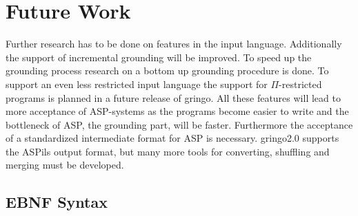\documentclass[a4paper,10pt]{article}
\begin{document}
\section{Future Work}
Further research has to be done on features in the input language. Additionally the support of incremental grounding will be improved. To speed up the grounding process research on a bottom up grounding procedure is done. To support an even less restricted input language the support for $\Pi$-restricted programs is planned in a future release of gringo. All these features will lead to more acceptance of ASP-systems as the programs become easier to write and the bottleneck of ASP, the grounding part, will be faster.
Furthermore the acceptance of a standardized intermediate format for ASP is necessary. gringo2.0 supports the ASPils output format, but many more tools for converting, shuffling and merging must be developed.
\newpage
\textbf{\appendixname}
\begin{appendix}
\section{EBNF Syntax}
\label{appendix}

\end{appendix}



\appendix
\end{document}
